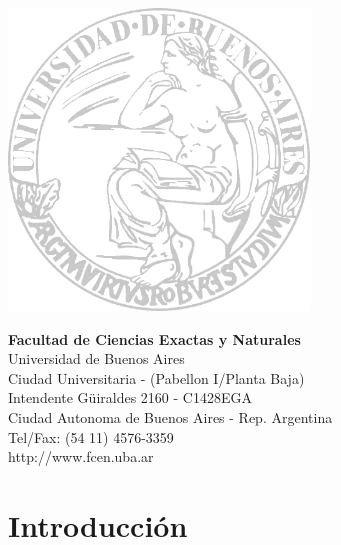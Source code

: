 \documentclass[a4paper]{article}
\begin{document}
\vspace{1.5cm}


\begin{multicols}{2}
\includegraphics[width=8cm]{logo-uba.png}

\columnbreak
\vspace*{4.5cm}
\raggedleft
\textbf{Facultad de Ciencias Exactas y Naturales}\\
Universidad de Buenos Aires\\
\small
Ciudad Universitaria - (Pabellon I/Planta Baja)\\
Intendente G\"uiraldes 2160 - C1428EGA\\
Ciudad Autonoma de Buenos Aires - Rep. Argentina\\
Tel/Fax: (54 11) 4576-3359\\
http://www.fcen.uba.ar
\end{multicols}

\restoregeometry

\clearpage


\tableofcontents

\clearpage

\section{Introducción}
\end{document}
